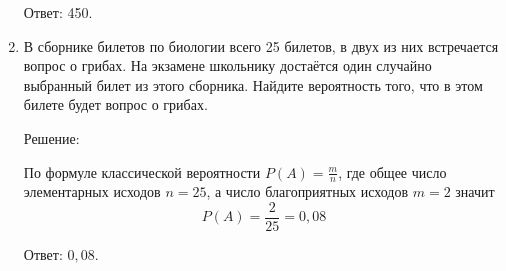 \documentclass{article}
\begin{document}
\begin{enumerate}
Ответ: 450.

\item %
В сборнике билетов по биологии всего 25 билетов, в двух из них встречается вопрос о грибах. На экзамене школьнику достаётся один случайно выбранный билет из этого сборника. Найдите вероятность того, что в этом билете будет вопрос о грибах.

Решение:

По формуле классической вероятности $P(A)=\frac{m}{n}$, где общее число элементарных исходов $n=25$, а число благоприятных исходов $m=2$ значит $$P(A)=\frac{2}{25}=0,08$$

Ответ: $0,08$.

\end{enumerate}
\end{document}
